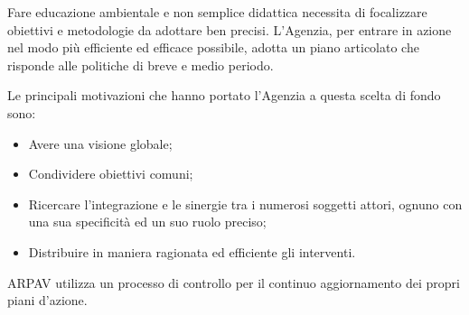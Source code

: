 Fare educazione ambientale e non semplice didattica necessita di focalizzare obiettivi e metodologie da adottare ben precisi. L'Agenzia, per entrare in azione nel modo più efficiente ed efficace possibile, adotta un piano articolato che risponde alle politiche di breve e medio periodo.

Le principali motivazioni che hanno portato l'Agenzia a questa scelta di fondo sono:
\begin{itemize}
\item Avere una visione globale;
\item Condividere obiettivi comuni;
\item Ricercare l'integrazione e le sinergie tra i numerosi soggetti attori, ognuno con una sua specificità ed un suo ruolo preciso;
\item Distribuire in maniera ragionata ed efficiente gli interventi.
\end{itemize}

ARPAV utilizza un processo di controllo per il continuo aggiornamento dei propri piani d'azione.

